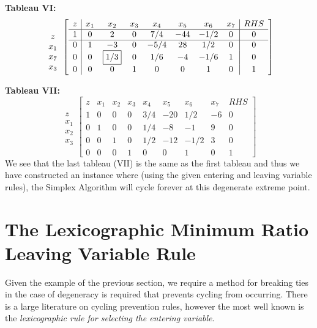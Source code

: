 \begin{example}
\noindent\textbf{Tableau VI:}
\begin{displaymath}
\begin{array}{c}
\\z\\x_1\\x_7\\x_3
\end{array}\left[
\begin{array}{c|ccccccc|c}
z & x_1 & x_2 & x_3 & x_4 & x_5 & x_6 & x_7 & RHS\\
\hline
1 & 0 & 2 & 0 & 7/4 & -44 & -1/2 & 0 & 0\\
\hline
0 & 1  & -3    & 0 & -5/4  & 28   & 1/2  & 0    & 0\\
0 & 0  & \fbox{1/3}  & 0 &  1/6  & -4   & -1/6 & 1    & 0\\
0 & 0  &  0    & 1 &  0    &  0   & 1    & 0    & 1
\end{array}\right]
\end{displaymath}

\noindent\textbf{Tableau VII:}
\begin{displaymath}
\begin{array}{c}
\\z\\x_1\\x_2\\x_3
\end{array}\left[
\begin{array}{c|ccccccc|c}
z & x_1 & x_2 & x_3 & x_4 & x_5 & x_6 & x_7 & RHS\\
\hline
1 & 0 & 0 & 0 & 3/4 & -20 & 1/2  & -6 & 0\\
\hline
0 & 1 & 0 & 0 & 1/4 & -8  & -1   & 9  & 0\\
0 & 0 & 1 & 0 & 1/2 & -12 & -1/2 & 3  & 0\\
0 & 0 & 0 & 1 & 0   &  0  & 1    & 0  & 1
\end{array}\right]
\end{displaymath}
We see that the last tableau (VII) is the same as the first tableau and thus we have constructed an instance where (using the given entering and leaving variable rules), the Simplex Algorithm will cycle forever at this degenerate extreme point.
\label{ex:CyclingDegen}
\end{example}


\section{The Lexicographic Minimum Ratio Leaving Variable Rule}
Given the example of the previous section, we require a method for breaking ties in the case of degeneracy is required that prevents cycling from occurring. There is a large literature on cycling prevention rules, however the most well known is the \textit{lexicographic rule for selecting the entering variable}.

